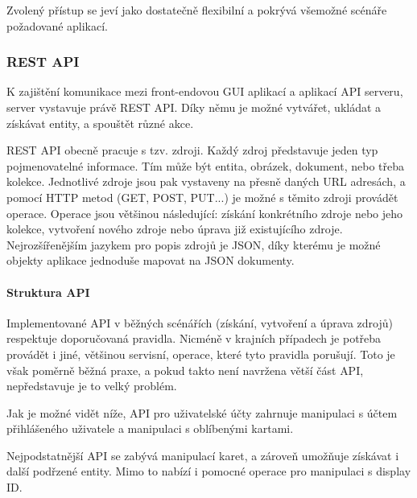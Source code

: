 		Zvolený přístup se jeví jako dostatečně flexibilní a pokrývá všemožné scénáře požadované aplikací.

		\subsubsection{REST API}

		K zajištění komunikace mezi front-endovou \ac{GUI} aplikací a aplikací \ac{API} serveru, server
		vystavuje právě \ac{REST} \ac{API}.
		Díky němu je možné vytvářet, ukládat a získávat entity, a spouštět různé akce.

		\ac{REST} \ac{API} obecně pracuje s tzv. zdroji.
		Každý zdroj představuje jeden typ pojmenovatelné informace.
		Tím může být entita, obrázek, dokument, nebo třeba kolekce.
		Jednotlivé zdroje jsou pak vystaveny na přesně daných \ac{URL} adresách, a pomocí \ac{HTTP} metod (GET, POST, PUT...)
		je možné s těmito zdroji provádět operace.
		Operace jsou většinou následující: získání konkrétního zdroje nebo jeho kolekce, vytvoření nového zdroje nebo
		úprava již existujícího zdroje.
		Nejrozšířenějším jazykem pro popis zdrojů je \ac{JSON}, díky kterému je možné objekty aplikace jednoduše
		mapovat na \ac{JSON} dokumenty. \cite{restfulapi}

			\paragraph{Struktura API}

			Implementované \ac{API} v běžných scénářích (získání, vytvoření a úprava zdrojů) respektuje doporučovaná pravidla.
			Nicméně v krajních případech je potřeba provádět i jiné, většinou servisní, operace, které tyto pravidla porušují.
			Toto je však poměrně běžná praxe, a pokud takto není navržena větší část \ac{API}, nepředstavuje je to velký
			problém.

			Jak je možné vidět níže, \ac{API} pro uživatelské účty zahrnuje manipulaci s účtem přihlášeného uživatele a manipulaci
			s oblíbenými kartami.


			Nejpodstatnější \ac{API} se zabývá manipulací karet, a zároveň umožňuje získávat i další podřzené entity.
			Mimo to nabízí i pomocné operace pro manipulaci s display ID.


